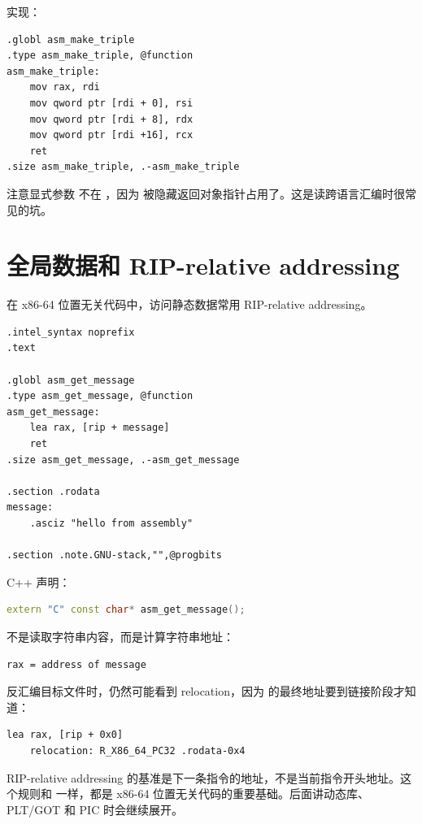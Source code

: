 实现：

\begin{lstlisting}
.globl asm_make_triple
.type asm_make_triple, @function
asm_make_triple:
    mov rax, rdi
    mov qword ptr [rdi + 0], rsi
    mov qword ptr [rdi + 8], rdx
    mov qword ptr [rdi +16], rcx
    ret
.size asm_make_triple, .-asm_make_triple
\end{lstlisting}

注意显式参数  不在 ，因为  被隐藏返回对象指针占用了。这是读跨语言汇编时很常见的坑。

\section{全局数据和 RIP-relative addressing}

在 x86-64 位置无关代码中，访问静态数据常用 RIP-relative addressing。

\begin{lstlisting}
.intel_syntax noprefix
.text

.globl asm_get_message
.type asm_get_message, @function
asm_get_message:
    lea rax, [rip + message]
    ret
.size asm_get_message, .-asm_get_message

.section .rodata
message:
    .asciz "hello from assembly"

.section .note.GNU-stack,"",@progbits
\end{lstlisting}

C++ 声明：

\begin{lstlisting}[language=C++]
extern "C" const char* asm_get_message();
\end{lstlisting}

 不是读取字符串内容，而是计算字符串地址：

\begin{lstlisting}
rax = address of message
\end{lstlisting}

反汇编目标文件时，仍然可能看到 relocation，因为  的最终地址要到链接阶段才知道：

\begin{lstlisting}
lea rax, [rip + 0x0]
    relocation: R_X86_64_PC32 .rodata-0x4
\end{lstlisting}

\begin{deepdive}
RIP-relative addressing 的基准是下一条指令的地址，不是当前指令开头地址。这个规则和   一样，都是 x86-64 位置无关代码的重要基础。后面讲动态库、PLT/GOT 和 PIC 时会继续展开。
\end{deepdive}

